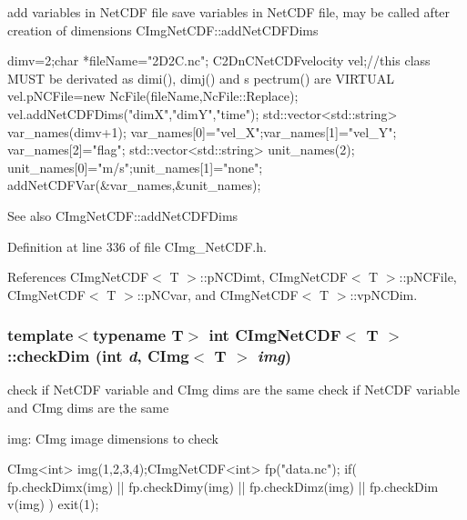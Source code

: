 add variables in NetCDF file save variables in NetCDF file, may be called after creation of dimensions {\ttfamily CImgNetCDF::addNetCDFDims} 


\begin{DoxyCode}
   dimv=2;char *fileName="2D2C.nc";
   C2DnCNetCDFvelocity vel;//this class MUST be derivated as dimi(), dimj() and s
      pectrum() are VIRTUAL
   vel.pNCFile=new NcFile(fileName,NcFile::Replace);
   vel.addNetCDFDims("dimX","dimY","time");
   std::vector<std::string> var_names(dimv+1);
   var_names[0]="vel_X";var_names[1]="vel_Y";
   var_names[2]="flag";
   std::vector<std::string> unit_names(2);
   unit_names[0]="m/s";unit_names[1]="none";
   addNetCDFVar(&var_names,&unit_names);
\end{DoxyCode}


\begin{DoxySeeAlso}{See also}
CImgNetCDF::addNetCDFDims 
\end{DoxySeeAlso}


Definition at line 336 of file CImg\_\-NetCDF.h.

References CImgNetCDF$<$ T $>$::pNCDimt, CImgNetCDF$<$ T $>$::pNCFile, CImgNetCDF$<$ T $>$::pNCvar, and CImgNetCDF$<$ T $>$::vpNCDim.\hypertarget{classCImgNetCDF_aa5dd32c8cec3b27aee106846b3fc67c9}{
\subsubsection[{checkDim}]{\setlength{\rightskip}{0pt plus 5cm}template$<$typename T$>$ int {\bf CImgNetCDF}$<$ T $>$::checkDim (int {\em d}, \/  CImg$<$ T $>$ {\em img})}}
\label{classCImgNetCDF_aa5dd32c8cec3b27aee106846b3fc67c9}


check if NetCDF {\ttfamily variable} and {\ttfamily CImg} dims are the same check if NetCDF {\ttfamily variable} and {\ttfamily CImg} dims are the same

\begin{DoxyItemize}
\item img: {\ttfamily CImg} image dimensions to check\end{DoxyItemize}

\begin{DoxyCode}
   CImg<int> img(1,2,3,4);CImgNetCDF<int> fp("data.nc");
   if( fp.checkDimx(img) || fp.checkDimy(img) || fp.checkDimz(img) || fp.checkDim
      v(img) ) exit(1);
\end{DoxyCode}


